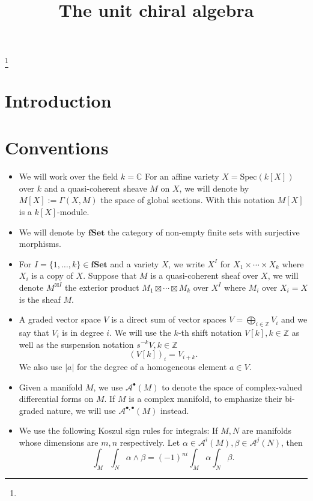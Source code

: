 \documentclass[11pt]{amsart}
\theoremstyle{definition}
\theoremstyle{remark}
\numberwithin{equation}{section}
\newcommand{\CC}{\mathbb{C}}
\newcommand{\bu}{\bullet}
\begin{document}
\title[]{The unit chiral algebra}%
\author{}%
\address{}%
\email{}%

\thanks{}%
\subjclass{}%
\keywords{}%

\begin{abstract}

\end{abstract}
\maketitle
\tableofcontents



\section{Introduction}
\section{Conventions}

\begin{itemize}

  \item We will work over the field $k = \CC$ %
        For an affine variety $X=\mathrm{Spec}(k[X])$ over $k$ and a quasi-coherent sheave $M$ on $X$, we will denote by $M[X]:=\Gamma(X,M)$ the space of global sections. With this notation $M[X]$ is a $k[X]$-module.
\item We will denote by $\mathbf{fSet}$ the category of non-empty finite sets with surjective morphisms. 
\item For ${I}=\{1,\dots,k\}\in {\mathbf{fSet}}$ and a variety $X$, we write $X^{{I}}$ for $X_1\times \cdots \times X_k$ where $X_i$ is a copy of $X$. Suppose that $M$ is a quasi-coherent sheaf over $X$, we will denote $M^{\boxtimes{I}}$ the exterior product $M_1\boxtimes \cdots \boxtimes M_k$ over $X^{{I}}$ where $M_i$ over $X_i=X$ is the sheaf $M$.
  \item A graded vector space $V$ is a direct sum of vector spaces $V=\mathop{\bigoplus}\limits_{i\in\mathbb{Z}}V_i$ and we say that $V_{i}$ is in degree $i$.
        We will use the $k$-th shift notation $V[k],k\in \mathbb{Z}$ as well as the suspension notation $s^{-k}V,k\in\mathbb{Z}$
$$
(V[k])_i=V_{i+k}.$$
We also use $|a|$ for the degree of a homogeneous element $a\in V.$
\item Given a manifold $M$, we use $\mathcal{A}^{\bu}(M)$ to denote the space
        of complex-valued differential forms on $M$.
        If $M$ is a
    complex manifold, to emphasize their bi-graded nature, we will use
    $\mathcal{A}^{\bu,\bu} (M)$ instead.
\item We use the following Koszul sign rules for integrals: If $M, N$ are manifolds whose dimensions are $m, n$ respectively. Let $\alpha \in \mathcal{A}^{i}(M),     \beta \in \mathcal{A}^{j}(N)$, then 
$$
\int_M \int_N \alpha \wedge\beta = (- 1)^{n i} \int_M \alpha \int_N \beta . 
$$
\end{itemize}
\end{document}
